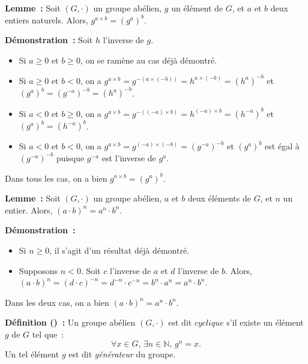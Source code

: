    \done

\medskip

\noindent\textbf{Lemme :} Soit $(G,\cdot)$ un groupe abélien, $g$ un élément de $G$, et $a$ et $b$ deux entiers naturels. 
    Alors, $g^{a \times b} = (g^a)^b$.

\medskip

\noindent\textbf{Démonstration :} Soit $h$ l'inverse de $g$. 
    \begin{itemize}[nosep]
        \item Si $a \geq 0$ et $b \geq 0$, on se ramène au cas déjà démontré.
        \item Si $a \geq 0$ et $b < 0$, on a $g^{a \times b} = g^{-(a \times (-b))} = h^{a \times (-b)} = (h^a)^{-b}$ et $(g^a)^b = (g^{-a})^{-b} = (h^a)^{-b}$.
        \item Si $a < 0$ et $b \geq 0$, on a $g^{a \times b} = g^{-((-a) \times b)} = h^{(-a) \times b} = (h^{-a})^b$ et $(g^a)^b = (h^{-a})^b$.
        \item Si $a < 0$ et $b < 0$, on a $g^{a \times b} = g^{(-a) \times (-b)} = (g^{-a})^{-b}$ et $(g^a)^b$ est égal à $(g^{-a})^{-b}$ puisque $g^{-a}$ est l'inverse de $g^a$.
    \end{itemize}
    Dans tous les cas, on a bien $g^{a \times b} = (g^a)^b$.

\medskip

\noindent\textbf{Lemme :} Soit $(G, \cdot)$ un groupe abélien, $a$ et $b$ deux éléments de $G$, et $n$ un entier. 
    Alors, $(a \cdot b)^n = a^n \cdot b^n$.

\medskip

\noindent\textbf{Démonstration :} 
\begin{itemize}[nosep]
    \item Si $n \geq 0$, il s'agit d'un résultat déjà démontré.
    \item Supposons $n < 0$. 
        Soit $c$ l'inverse de $a$ et $d$ l'inverse de $b$.
        Alors, $(a \cdot b)^n = (d \cdot c)^{-n} = d^{-n} \cdot c^{-n} = b^n \cdot a^n = a^n \cdot b^n$.
\end{itemize}
Dans les deux cas, on a bien $(a \cdot b)^n = a^n \cdot b^n$.

\done

\medskip

\noindent\textbf{Définition () :} Un groupe abélien $(G, \cdot)$ est dit $\textit{cyclique}$ s'il existe un élément $g$ de $G$ tel que : 
    \begin{equation*}
        \forall x \in G, \, \exists n \in \mathbb{N}, \, g^n = x.
    \end{equation*}
    Un tel élément $g$ est dit \textit{générateur} du groupe.

